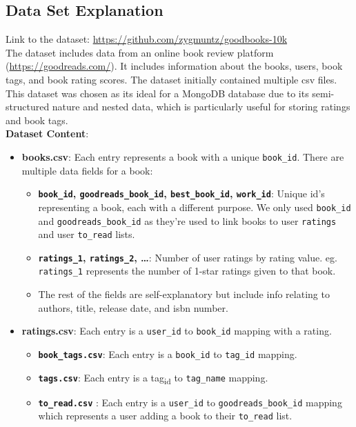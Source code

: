 \documentclass[11pt]{article}
\begin{document}
\subsection{Data Set Explanation}
\label{sec:org7f91e07}
Link to the dataset: \url{https://github.com/zygmuntz/goodbooks-10k}\\
\linebreak
The dataset includes data from an online book review platform (\url{https://goodreads.com/}). It includes information about the books, users, book tags, and book rating scores. The dataset initially contained multiple csv files. This dataset was chosen as its ideal for a MongoDB database due to its semi-structured nature and nested data, which is particularly useful for storing ratings and book tags. \\
\linebreak
\textbf{Dataset Content}:
\begin{itemize}
\item \textbf{books.csv}: Each entry represents a book with a unique \texttt{book\_id}. There are multiple data fields for a book:
\begin{itemize}
\item \textbf{\texttt{book\_id}, \texttt{goodreads\_book\_id}, \texttt{best\_book\_id}, \texttt{work\_id}}: Unique id’s representing a book, each with a different purpose. We only used \texttt{book\_id} and \texttt{goodreads\_book\_id} as they’re used to link books to user \texttt{ratings} and user \texttt{to\_read} lists.
\item \textbf{\texttt{ratings\_1}, \texttt{ratings\_2}, …}: Number of user ratings by rating value. eg. \texttt{ratings\_1} represents the number of 1-star ratings given to that book.
\item The rest of the fields are self-explanatory but include info relating to authors, title, release date, and isbn number.
\end{itemize}
\item \textbf{ratings.csv}: Each entry is a \texttt{user\_id} to \texttt{book\_id} mapping with a rating.
\begin{itemize}
\item \textbf{\texttt{book\_tags.csv}}: Each entry is a \texttt{book\_id} to \texttt{tag\_id} mapping.
\item \textbf{\texttt{tags.csv}}: Each entry is a tag\textsubscript{id} to \texttt{tag\_name} mapping.
\item \textbf{\texttt{to\_read.csv}} : Each entry is a \texttt{user\_id} to \texttt{goodreads\_book\_id} mapping which represents a user adding a book to their \texttt{to\_read} list.
\end{itemize}
\end{itemize}
\end{document}
